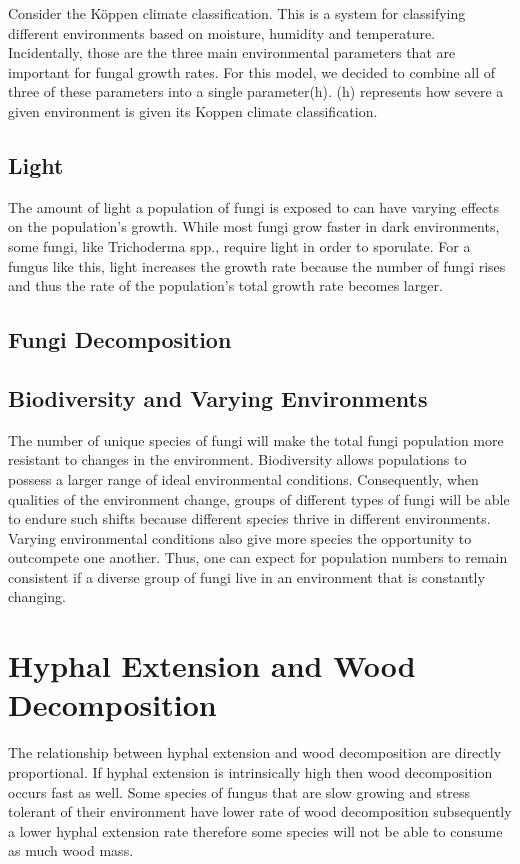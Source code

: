 \documentclass[twocolumn]{article} %
\begin{document}
Consider the Köppen climate classification. This is a system for classifying different environments based on moisture, humidity and temperature. Incidentally, those are the three main environmental parameters that are important for fungal growth rates. For this model, we decided to combine all of three of these parameters into a single parameter(h). (h) represents how severe a given environment is given its Koppen climate classification.

\subsection{Light}
The amount of light a population of fungi is exposed to can have varying effects on the population’s growth. While most fungi grow faster in dark environments, some fungi, like Trichoderma spp., require light in order to sporulate. For a fungus like this, light increases the growth rate because the number of fungi rises and thus the rate of the population’s total growth rate becomes larger.

\subsection{Fungi Decomposition}

\subsection{Biodiversity and Varying Environments}

The number of unique species of fungi will make the total fungi population more resistant to changes in the environment. Biodiversity allows populations to possess a larger range of ideal environmental conditions. Consequently, when qualities of the environment change, groups of different types of fungi will be able to endure such shifts because different species thrive in different environments. Varying environmental conditions also give more species the opportunity to outcompete one another. Thus, one can expect for population numbers to remain consistent if a diverse group of fungi live in an environment that is constantly changing.

\section{Hyphal Extension and Wood Decomposition}
The relationship between hyphal extension and wood decomposition are directly proportional. If hyphal extension is intrinsically high then wood decomposition occurs fast as well. Some species of fungus that are slow growing and stress tolerant of their environment have lower rate of wood decomposition subsequently a lower hyphal extension rate therefore some species will not be able to consume as much wood mass. 
\end{document}

